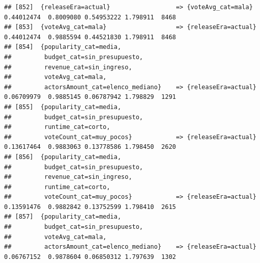 \documentclass[
]{article}
\begin{document}
\begin{verbatim}
## [852]  {releaseEra=actual}                  => {voteAvg_cat=mala}                0.44012474  0.8009080 0.54953222 1.798911  8468
## [853]  {voteAvg_cat=mala}                   => {releaseEra=actual}               0.44012474  0.9885594 0.44521830 1.798911  8468
## [854]  {popularity_cat=media,                                                                                                   
##         budget_cat=sin_presupuesto,                                                                                             
##         revenue_cat=sin_ingreso,                                                                                                
##         voteAvg_cat=mala,                                                                                                       
##         actorsAmount_cat=elenco_mediano}    => {releaseEra=actual}               0.06709979  0.9885145 0.06787942 1.798829  1291
## [855]  {popularity_cat=media,                                                                                                   
##         budget_cat=sin_presupuesto,                                                                                             
##         runtime_cat=corto,                                                                                                      
##         voteCount_cat=muy_pocos}            => {releaseEra=actual}               0.13617464  0.9883063 0.13778586 1.798450  2620
## [856]  {popularity_cat=media,                                                                                                   
##         budget_cat=sin_presupuesto,                                                                                             
##         revenue_cat=sin_ingreso,                                                                                                
##         runtime_cat=corto,                                                                                                      
##         voteCount_cat=muy_pocos}            => {releaseEra=actual}               0.13591476  0.9882842 0.13752599 1.798410  2615
## [857]  {popularity_cat=media,                                                                                                   
##         budget_cat=sin_presupuesto,                                                                                             
##         voteAvg_cat=mala,                                                                                                       
##         actorsAmount_cat=elenco_mediano}    => {releaseEra=actual}               0.06767152  0.9878604 0.06850312 1.797639  1302

\end{verbatim}
\end{document}
